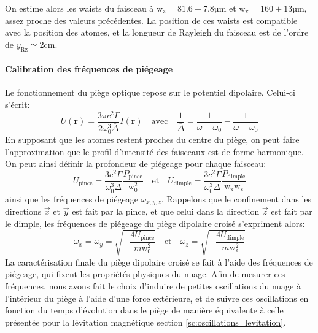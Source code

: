 On estime alors les waists du faisceau à $\mathrm{w_z}=81.6 \pm 7.8$µm et $\mathrm{w_x}=160\pm 13$µm, assez proche des valeurs précédentes. La position de ces waists est compatible avec la position des atomes, et la longueur de Rayleigh du faisceau est de l'ordre de $y_{\mathrm{Rz}}\simeq$2cm.








\paragraph*{Calibration des fréquences de piégeage}
Le fonctionnement du piège optique repose sur le potentiel dipolaire. Celui-ci s'écrit:
\begin{equation}
U(\mathbf{r})=\frac{3 \pi c^2 \Gamma}{2 \omega_0^3 \overline{\Delta}} I(\mathbf{r}) \quad \text{avec} \quad \frac{1}{\overline{\Delta}}=\frac{1}{\omega-\omega_0}-\frac{1}{\omega+\omega_0}
\end{equation}
En supposant que les atomes restent proches du centre du piège, on peut faire l'approximation que le profil d'intensité des faisceaux est de forme harmonique. On peut ainsi définir la profondeur de piégeage pour chaque faisceau:
\begin{equation}
U_{\mathrm{pince}}= \frac{3c^2 \Gamma }{\omega_0^3 \overline{\Delta}} \frac{P_{\mathrm{pince}}}{\mathrm{w}_0^2} \quad \text{et} \quad U_{\mathrm{dimple}}=\frac{3c^2 \Gamma }{\omega_0^3 \overline{\Delta}}\frac{P_{\mathrm{dimple}}}{\mathrm{w}_{\mathrm{x}} \mathrm{w}_{\mathrm{z}}}
\label{eq:profondeur_piege_optique}
\end{equation}
ainsi que les fréquences de piégeage $\omega_{x,y,z}$. Rappelons que le confinement dans les directions $\vec{x}$ et $\vec{y}$ est fait par la pince, et que celui dans la direction $\vec{z}$ est fait par le dimple, les fréquences de piégeage du piège dipolaire croisé s'expriment alors:
\begin{equation}
\omega_x=\omega_y=\sqrt{-\frac{4 U_{\mathrm{pince}}}{m \mathrm{w}_0^2}} \quad \text{et} \quad \omega_z=\sqrt{-\frac{4U_{\mathrm{dimple}}}{m \mathrm{w}_{\mathrm{z}}^2}}
\label{eq:frequences_piege_optique}
\end{equation}
La caractérisation finale du piège dipolaire croisé se fait à l'aide des fréquences de piégeage, qui fixent les propriétés physiques du nuage. Afin de mesurer ces fréquences, nous avons fait le choix d'induire de petites oscillations du nuage à l'intérieur du piège à l'aide d'une force extérieure, et de suivre ces oscillations en fonction du temps d'évolution dans le piège de manière équivalente à celle présentée pour la lévitation magnétique section \ref{sc:oscillations_levitation}. 

